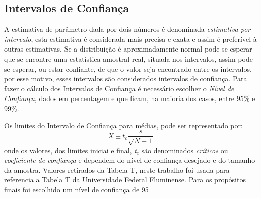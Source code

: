 \subsection{Intervalos de Confiança}

A estimativa de parâmetro dada por dois números é denominada \textit{estimativa por intervalo}, esta estimativa é considerada mais precisa e exata e assim é preferível à outras estimativas. Se a distribuição é aproximadamente normal pode se esperar que se encontre uma estatística amostral real, situada nos intervalos, assim pode-se esperar, ou estar confiante, de que o valor seja encontrado entre os intervalos, por esse motivo, esses intervalos são considerados intervalos de confiança. Para fazer o cálculo dos Intervalos de Confiança é necessário escolher o \textit{Nível de Confiança}, dados em percentagem e que ficam, na maioria dos casos, entre 95\% e 99\%.

Os limites do Intervalo de Confiança para médias, pode ser representado por:
\begin{displaymath}
\bar{X}  \pm \mathit{t}_{\mathit{c}}\frac{\mathit{s}}{{\sqrt{N-1}}}
\end{displaymath}
onde os valores, dos limites iniciai e final, \textit{t$_c$} são denominados \textit{críticos} ou \textit{coeficiente de confiança} e dependem do nível de confiança desejado e do tamanho da amostra. Valores retirados da Tabela T, neste trabalho foi usada para referencia a Tabela T da Universidade Federal Fluminense\cite{TabelaUFF}. Para os propósitos finais foi escolhido um nível de confiança de 95%
